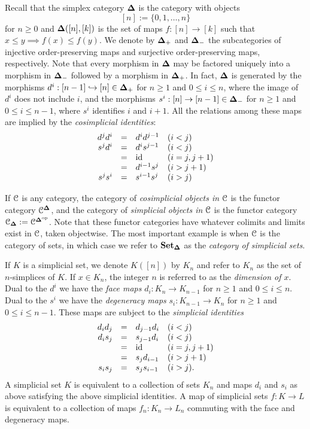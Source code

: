 \documentclass[../main.tex]{subfiles}
\begin{document}
Recall that the simplex category $\mathbf{\Delta}$ is the category with objects
\[[n]:=\{0,1,\ldots,n\}\]
for $n\geq0$ and $\mathbf{\Delta}([n],[k])$ is the set of maps $f:[n]\to[k]$ such that $x\leq y\implies f(x)\leq f(y)$. We denote by $\mathbf{\Delta}_+$ and $\mathbf{\Delta}_-$ the subcategories of injective order-preserving maps and surjective order-preserving maps, respectively. Note that every morphism in $\mathbf{\Delta}$ may be factored uniquely into a morphism in $\mathbf{\Delta}_-$ followed by a morphism in $\mathbf{\Delta}_+$. In fact, $\mathbf{\Delta}$ is generated by the morphisms $d^i:[n-1]\hookrightarrow[n]\in\mathbf{\Delta}_+$ for $n\geq1$ and $0\leq i\leq n$, where the image of $d^i$ does not include $i$, and the morphisms $s^i:[n]\to[n-1]\in\mathbf{\Delta}_-$ for $n\geq1$ and $0\leq i\leq n-1$, where $s^i$ identifies $i$ and $i+1$. All the relations among these maps are implied by the \textit{cosimplicial identities}:
\[
  \begin{array}{rcll}
    d^jd^i & = & d^id^{j-1} & (i<j) \\
    s^jd^i & = & d^is^{j-1} & (i<j) \\
    & = & \mathrm{id} & (i=j,j+1) \\
    & = & d^{i-1}s^j & (i>j+1) \\
    s^js^i & = & s^{i-1}s^j & (i>j)
  \end{array}
\]

If $\mathcal C$ is any category, the category of \textit{cosimplicial objects in $\mathcal C$} is the functor category $\mathcal C^{\mathbf{\Delta}}$, and the category of \textit{simplicial objects in $\mathcal C$} is the functor category $\mathcal C_{\mathbf{\Delta}}:=\mathcal C^{\mathbf{\Delta}^{\mathrm{op}}}$. Note that these functor categories have whatever colimits and limits exist in $\mathcal C$, taken objectwise. The most important example is when $\mathcal C$ is the category of sets, in which case we refer to $\mathbf{Set}_{\mathbf{\Delta}}$ as the \textit{category of simplicial sets}.

If $K$ is a simplicial set, we denote $K([n])$ by $K_n$ and refer to $K_n$ as the set of $n$-simplices of $K$. If $x\in K_n$, the integer $n$ is referred to as the \textit{dimension of $x$}. Dual to the $d^i$ we have the \textit{face maps} $d_i:K_n\to K_{n-1}$ for $n\geq1$ and $0\leq i\leq n$. Dual to the $s^i$ we have the \textit{degeneracy maps} $s_i:K_{n-1}\to K_n$ for $n\geq1$ and $0\leq i\leq n-1$. These maps are subject to the \textit{simplicial identities}
\[
  \begin{array}{rcll}
    d_id_j & = & d_{j-1}d_i & (i<j) \\
    d_is_j & = & s_{j-1}d_i & (i<j) \\
    & = & \mathrm{id} & (i=j,j+1) \\
    & = & s_jd_{i-1} & (i>j+1) \\
    s_is_j & = & s_{j}s_{i-1} & (i>j).
  \end{array}
\]
A simplicial set $K$ is equivalent to a collection of sets $K_n$ and maps $d_i$ and $s_i$ as above satisfying the above simplicial identities. A map of simplicial sets $f:K\to L$ is equivalent to a collection of maps $f_n:K_n\to L_n$ commuting with the face and degeneracy maps.
\end{document}
